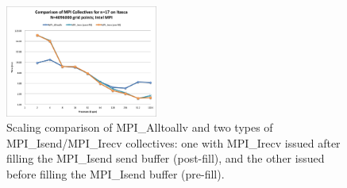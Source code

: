 \documentclass{report}
\begin{document}
\begin{figure}
\centering
\includegraphics[width=5cm]{performance_content/scaling/strong_scaling_4M_regular_n17comparison_commOnly.png}
\caption{Scaling comparison of MPI\_Alltoallv and two types of MPI\_Isend/MPI\_Irecv collectives: one with MPI\_Irecv issued after filling the MPI\_Isend send buffer (post-fill), and the other issued before filling the MPI\_Isend buffer (pre-fill).}
\end{figure}
\end{document}
